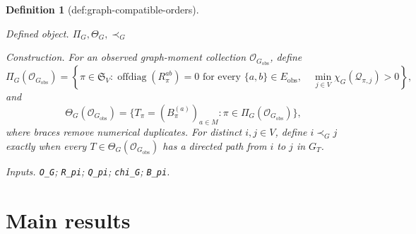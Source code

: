 \documentclass{article}
\newtheorem{definition}{Definition}
\begin{document}
\begin{definition}[def:graph-compatible-orders]\label{def:graph-compatible-orders}
\par\smallskip\noindent\emph{Defined object.} \(\Pi_G,\Theta_G,\prec_G\)
\par\smallskip\noindent\emph{Construction.} For an observed graph-moment collection \(\mathcal O_{G_{\mathrm{obs}}}\), define
\[
\Pi_G(\mathcal O_{G_{\mathrm{obs}}})=
\left\{\pi\in\mathfrak S_V:
\operatorname{offdiag}(R_\pi^{ab})=0\text{ for every }\{a,b\}\in E_{\mathrm{obs}},\quad
\min_{j\in V}\chi_G(\mathcal Q_{\pi,j})>0
\right\},
\]
and
\[
\Theta_G(\mathcal O_{G_{\mathrm{obs}}})=
\{T_\pi=(B_\pi^{(a)})_{a\in M}:\pi\in\Pi_G(\mathcal O_{G_{\mathrm{obs}}})\},
\]
where braces remove numerical duplicates.  For distinct \(i,j\in V\), define \(i\prec_Gj\) exactly when every \(T\in\Theta_G(\mathcal O_{G_{\mathrm{obs}}})\) has a directed path from \(i\) to \(j\) in \(G_T\).
\par\smallskip\noindent\emph{Inputs.} \texttt{O\_\allowbreak{}G}; \texttt{R\_\allowbreak{}pi}; \texttt{Q\_\allowbreak{}pi}; \texttt{chi\_\allowbreak{}G}; \texttt{B\_\allowbreak{}pi}.
\end{definition}

\section{Main results}
\end{document}
